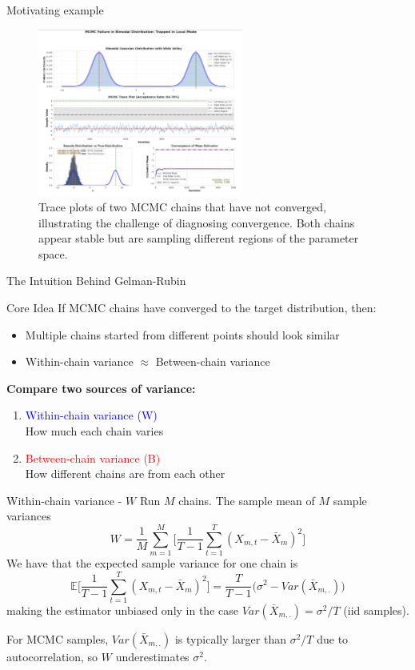 \begin{frame}{Motivating example}
	\begin{figure}
		\centering
		\includegraphics[width=0.6\textwidth]{bimodal.jpg}
		\caption{Trace plots of two MCMC chains that have not converged, illustrating the challenge of diagnosing convergence. Both chains appear stable but are sampling different regions of the parameter space.}
	\end{figure}
\end{frame}

\begin{frame}{The Intuition Behind Gelman-Rubin}
	\begin{block}{Core Idea}
		If MCMC chains have converged to the target distribution, then:
		\begin{itemize}
			\item Multiple chains started from different points should look similar
			\item Within-chain variance $\approx$ Between-chain variance 
		\end{itemize}
	\end{block}

	\textbf{Compare two sources of variance:}
	\begin{enumerate}
		\item \textcolor{blue}{Within-chain variance (W)}\\
		      How much each chain varies
		\item \textcolor{red}{Between-chain variance (B)}\\
		      How different chains are from each other
	\end{enumerate}
\end{frame}

\begin{frame}{Within-chain variance - $W$}
	Run $M$ chains. The sample mean of $M$ sample variances
	$$W  = \frac{1}{M} \sum_{m=1}^M \Big[\frac{1}{T-1} \sum_{t=1}^T (X_{m,t} - \bar{X}_m)^2\Big]$$
	We have that the expected sample variance for one chain is
	$$\mathbb{E}\Big[\frac{1}{T-1} \sum_{t=1}^T (X_{m,t} - \bar{X}_m)^2\Big] = \frac{T}{T-1} \Big(\sigma^2 - Var(\bar{X}_{m,.})\Big)$$
	making the estimator unbiased only in the case $Var(\bar{X}_{m,.}) = \sigma^2 / T$ (iid samples).

	For MCMC samples, $Var(\bar{X}_{m,.})$ is typically larger than $\sigma^2 / T$ due to
	autocorrelation, so $W$ underestimates $\sigma^2$.
\end{frame}

